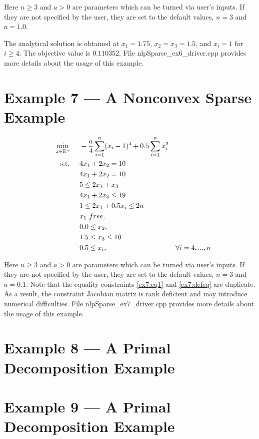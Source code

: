 \documentclass[11pt,letterpaper]{article}
\begin{document}
Here $n\geq3$ and $a>0$ are parameters which can be turned via user's inputs. If they are not specified by the user, they are set to the default values, $n=3$ and $a=1.0$.

The analytical solution is obtained at $x_1=1.75$, $x_2=x_3=1.5$, and $x_i=1$ for $i\geq 4$. The objective value is $0.110352$.
File nlpSparse\_ex6\_driver.cpp provides more details about the usage of this example.

\section{Example 7 --- A Nonconvex Sparse Example}
\begin{align}
    &&&&\min_{x\in\mathbb{R}^n} & \hspace{0.5cm} -\frac{a}{4}\sum_{i=1}^{n} (x_i-1)^4 + 0.5\sum_{i=1}^{n} x_i^2&&&& \label{ex7:obj}\\
    &&&&\textnormal{s.t.} &\hspace{0.5cm}  4x_1+2x_2 = 10 &&&& \label{ex7:eq1}\\
    &&&&& \hspace{0.5cm}  4x_1+2x_2 = 10 &&&& \label{ex7:defeq}\\
    &&&&& \hspace{0.5cm}  5 \leq  2x_1 + x_3                 &&&& \label{ex7:ineq1}\\
    &&&&& \hspace{0.5cm}          4x_1      + 2x_3   \leq 19 &&&& \label{ex7:defineq}\\
    &&&&& \hspace{0.5cm}  1 \leq  2x_1      + 0.5x_i \leq 2n &&&& \label{ex7:ineq2}\\
    &&&&& \hspace{0.5cm}  x_1~free, &&&& \label{ex7:varb1}\\
    &&&&& \hspace{0.5cm}  0.0 \leq x_2, &&&& \label{ex7:varb2}\\
    &&&&& \hspace{0.5cm}  1.5 \leq x_3 \leq 10  &&&& \label{ex7:varb3}\\
    &&&&& \hspace{0.5cm}  0.5 \leq x_i, &\forall i=4,...,n    &&& \label{ex7:varb4}
\end{align}

Here $n\geq3$ and $a>0$ are parameters which can be turned via user's inputs. If they are not specified by the user, they are set to the default values, $n=3$ and $a=0.1$. Note that the equality constraints \eqref{ex7:eq1} and \eqref{ex7:defeq} are duplicate. As a result, the constraint Jacobian matrix is rank deficient and may introduce numerical difficulties. File nlpSparse\_ex7\_driver.cpp provides more details about the usage of this example.


\section{Example 8 --- A Primal Decomposition Example}
\section{Example 9 --- A Primal Decomposition Example}
\end{document}

